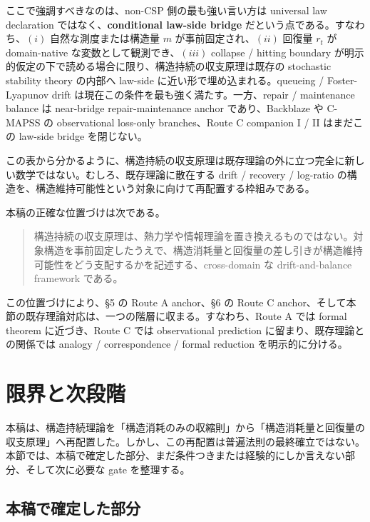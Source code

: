 \documentclass[12pt,a4paper]{article}
\begin{document}
ここで強調すべきなのは、non-CSP 側の最も強い言い方は universal law declaration ではなく、\textbf{conditional law-side bridge} だという点である。すなわち、\((i)\) 自然な測度または構造量 \(m\) が事前固定され、\((ii)\) 回復量 \(r_{t}\) が domain-native な変数として観測でき、\((iii)\) collapse / hitting boundary が明示的仮定の下で読める場合に限り、構造持続の収支原理は既存の stochastic stability theory の内部へ law-side に近い形で埋め込まれる。queueing / Foster-Lyapunov drift は現在この条件を最も強く満たす。一方、repair / maintenance balance は near-bridge repair-maintenance anchor であり、Backblaze や C-MAPSS の observational loss-only branches、Route C companion I / II はまだこの law-side bridge を閉じない。

この表から分かるように、構造持続の収支原理は既存理論の外に立つ完全に新しい数学ではない。むしろ、既存理論に散在する drift / recovery / log-ratio の構造を、構造維持可能性という対象に向けて再配置する枠組みである。

本稿の正確な位置づけは次である。

\begin{quote}
構造持続の収支原理は、熱力学や情報理論を置き換えるものではない。対象構造を事前固定したうえで、構造消耗量と回復量の差し引きが構造維持可能性をどう支配するかを記述する、cross-domain な drift-and-balance framework である。
\end{quote}

この位置づけにより、§5 の Route A anchor、§6 の Route C anchor、そして本節の既存理論対応は、一つの階層に収まる。すなわち、Route A では formal theorem に近づき、Route C では observational prediction に留まり、既存理論との関係では analogy / correspondence / formal reduction を明示的に分ける。

\section{限界と次段階}\label{ux9650ux754cux3068ux6b21ux6bb5ux968e}

本稿は、構造持続理論を「構造消耗のみの収縮則」から「構造消耗量と回復量の収支原理」へ再配置した。しかし、この再配置は普遍法則の最終確立ではない。本節では、本稿で確定した部分、まだ条件つきまたは経験的にしか言えない部分、そして次に必要な gate を整理する。

\subsection{本稿で確定した部分}\label{ux672cux7a3fux3067ux78baux5b9aux3057ux305fux90e8ux5206}
\end{document}
